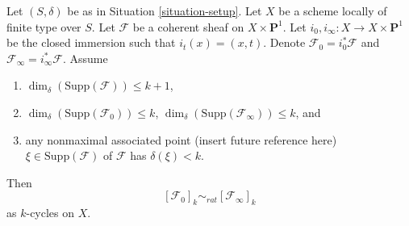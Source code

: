\begin{lemma}
\label{lemma-coherent-sheaf-cross-p1}
Let $(S, \delta)$ be as in Situation \ref{situation-setup}.
Let $X$ be a scheme locally of finite type over $S$.
Let $\mathcal{F}$ be a coherent sheaf on $X \times \mathbf{P}^1$.
Let $i_0, i_\infty : X \to X \times \mathbf{P}^1$ be the closed immersion
such that $i_t(x) = (x, t)$. Denote $\mathcal{F}_0 = i_0^*\mathcal{F}$ and
$\mathcal{F}_\infty = i_\infty^*\mathcal{F}$.
Assume
\begin{enumerate}
\item $\dim_\delta(\text{Supp}(\mathcal{F})) \leq k + 1$,
\item $\dim_\delta(\text{Supp}(\mathcal{F}_0)) \leq k$,
$\dim_\delta(\text{Supp}(\mathcal{F}_\infty)) \leq k$, and
\item any nonmaximal associated point
(insert future reference here) $\xi \in \text{Supp}(\mathcal{F})$
of $\mathcal{F}$ has $\delta(\xi) < k$.
\end{enumerate}
Then
$$
[\mathcal{F}_0]_k \sim_{rat} [\mathcal{F}_\infty]_k
$$
as $k$-cycles on $X$.
\end{lemma}

